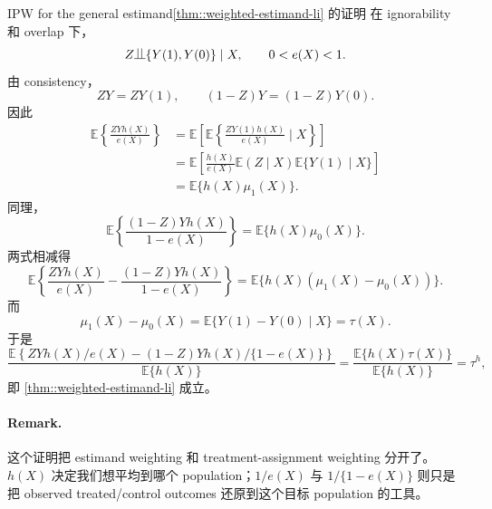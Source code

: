 \begin{exercisesolution}{IPW for the general estimand}{\cref{thm::weighted-estimand-li} 的证明}
在 ignorability 和 overlap 下，
\[
Z\ind \{Y(1),Y(0)\}\mid X,\qquad 0<e(X)<1.
\]
由 consistency，
\[
ZY=ZY(1),\qquad (1-Z)Y=(1-Z)Y(0).
\]
因此
\begin{align*}
\mathbb{E}\left\{\frac{ZYh(X)}{e(X)}\right\}
&=\mathbb{E}\left[
\mathbb{E}\left\{\frac{ZY(1)h(X)}{e(X)}\mid X\right\}
\right] \\
&=\mathbb{E}\left[
\frac{h(X)}{e(X)}
\mathbb{E}(Z\mid X)
\mathbb{E}\{Y(1)\mid X\}
\right] \\
&=\mathbb{E}\{h(X)\mu_1(X)\}.
\end{align*}
同理，
\[
\mathbb{E}\left\{\frac{(1-Z)Yh(X)}{1-e(X)}\right\}
=\mathbb{E}\{h(X)\mu_0(X)\}.
\]
两式相减得
\[
\mathbb{E}\left\{
\frac{ZYh(X)}{e(X)}
-\frac{(1-Z)Yh(X)}{1-e(X)}
\right\}
=\mathbb{E}\{h(X)(\mu_1(X)-\mu_0(X))\}.
\]
而
\[
\mu_1(X)-\mu_0(X)
=\mathbb{E}\{Y(1)-Y(0)\mid X\}
=\tau(X).
\]
于是
\[
\frac{
\mathbb{E}\left\{
ZYh(X)/e(X)-(1-Z)Yh(X)/\{1-e(X)\}
\right\}
}{
\mathbb{E}\{h(X)\}
}
=\frac{\mathbb{E}\{h(X)\tau(X)\}}{\mathbb{E}\{h(X)\}}
=\tau^h,
\]
即 \cref{thm::weighted-estimand-li} 成立。

\paragraph{Remark.}
这个证明把 estimand weighting 和 treatment-assignment weighting 分开了。$h(X)$ 决定我们想平均到哪个 population；$1/e(X)$ 与 $1/\{1-e(X)\}$ 则只是把 observed treated/control outcomes 还原到这个目标 population 的工具。
\end{exercisesolution}

